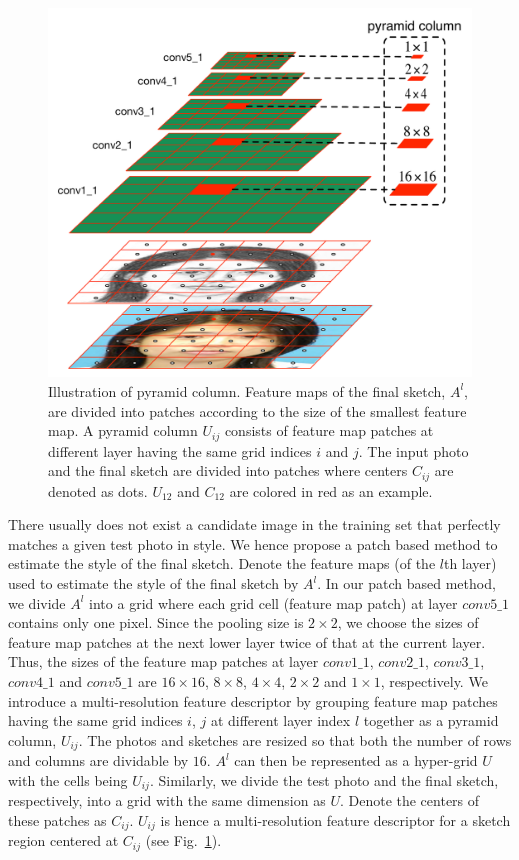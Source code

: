 \documentclass[10pt,twocolumn,letterpaper]{article}
\begin{document}
\begin{figure}[htbp]
\centering
\includegraphics[width=0.85\linewidth]{img/pyramidcolumn.pdf}
\caption{Illustration of pyramid column. Feature maps of the final sketch, $A^{l}$, are divided into patches according to the size of the smallest feature map. A pyramid column $U_{ij}$ consists of feature map patches at different layer having the same grid indices $i$ and $j$. The input photo and the final sketch are divided into patches where centers $C_{ij}$ are denoted as dots. $U_{12}$ and $C_{12}$ are colored in red as an example.}
\label{fig:pyramidcolumn}
\end{figure}
There usually does not exist a candidate image in the training set that perfectly matches a given test photo in style. We hence propose a patch based method to estimate the style of the final sketch. Denote the feature maps (of the $l$th layer) used to estimate the style of the final sketch by $A^{l}$. In our patch based method, we divide $A^{l}$ into a grid where each grid cell (feature map patch) at layer $conv5\_1$ contains only one pixel. Since the pooling size is $2\times2$, we choose the sizes of feature map patches at the next lower layer twice of that at the current layer. Thus, the sizes of the feature map patches at layer $conv1\_1$, $conv2\_1$, $conv3\_1$, $conv4\_1$ and $conv5\_1$ are $16\times16$, $8\times8$, $4\times4$, $2\times2$ and $1\times1$, respectively. We introduce a multi-resolution feature descriptor by grouping feature map patches having the same grid indices $i$, $j$ at different layer index $l$ together as a pyramid column, $U_{ij}$. The photos and sketches are resized so that both the number of rows and columns are dividable by $16$. $A^{l}$ can then be represented as a hyper-grid $U$ with the cells being $U_{ij}$. Similarly, we divide the test photo and the final sketch, respectively, into a grid with the same dimension as $U$. Denote the centers of these patches as $C_{ij}$. $U_{ij}$ is hence a multi-resolution feature descriptor for a sketch region centered at $C_{ij}$ (see Fig.~\ref{fig:pyramidcolumn}). 
\end{document}
